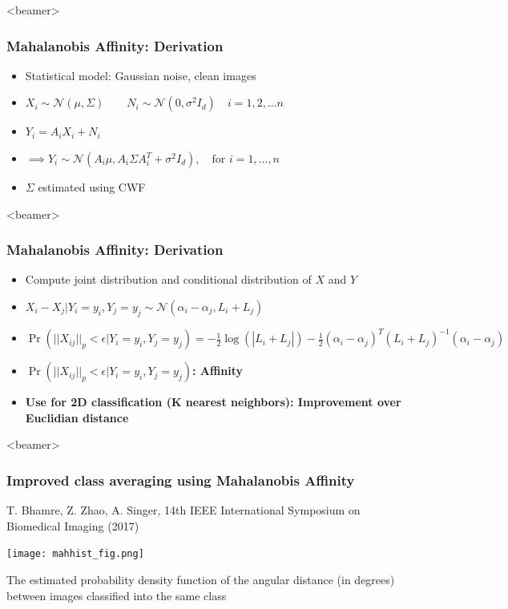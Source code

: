 \documentclass{beamer}
\begin{document}
\begin{frame}<beamer>
\frametitle{Mahalanobis Affinity: Derivation}
\begin{itemize}
\item Statistical model: Gaussian noise, clean images
\item $X_i  \sim \mathcal{N}( {\mu},\Sigma) \quad \quad
N_i  \sim \mathcal{N}(0,{\sigma}^2 I_d ) \quad i=1,2,\ldots n$
\item $Y_i = A_iX_i + N_i$
\item  $ \implies Y_i \sim \mathcal{N}(A_i \mu, A_i \Sigma A_i^T + \sigma^2 I_d),\quad \text{for } i=1,\ldots,n$
\item $\Sigma$ estimated using CWF
\end{itemize}
\end{frame}



\begin{frame}<beamer>
\frametitle{Mahalanobis Affinity: Derivation}
\begin{itemize}
\item Compute joint distribution and conditional distribution of $X$ and $Y$ 
\item $X_i - X_j|Y_i=y_i, Y_j=y_j \sim \mathcal{N}(\alpha_i-\alpha_j, L_i+L_j)$
\item $\Pr(||X_{ij}||_{p} < \epsilon|Y_i=y_i,Y_j=y_j) 
=  -\frac{1}{2}\log(|L_i + L_j|) -\frac{1}{2}(\alpha_i - \alpha_j)^T(L_i+L_j)^{-1}(\alpha_i -\alpha_j)$
\item  \textbf{$\Pr(||X_{ij}||_{p} < \epsilon|Y_i=y_i,Y_j=y_j)$: Affinity}
\item \textbf{Use for 2D classification (K nearest neighbors): Improvement over Euclidian distance}
\end{itemize}
\end{frame}


\begin{frame}<beamer>
\frametitle{Improved class averaging using Mahalanobis Affinity}
{\tiny T. Bhamre, Z. Zhao, A. Singer, 14th IEEE International Symposium on Biomedical Imaging (2017)}
\begin{center}
\texttt{[image: mahhist\_fig.png]}
\end{center}
The estimated probability density function of the angular distance (in degrees) between images classified into the same class 

\end{frame}
\end{document}
